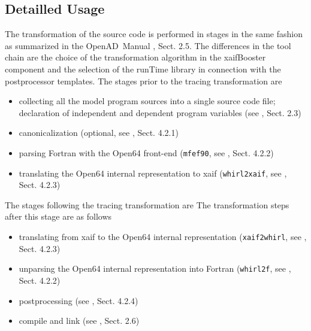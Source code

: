 \documentclass{article}
\newcommand{\openad}{OpenAD}
\begin{document}
\subsection{Detailled Usage}
The transformation of the source code is performed in stages in the same fashion as 
summarized in the \openad\ Manual \cite{userManual}, Sect. 2.5. 
The differences in the tool chain are the choice of the transformation algorithm 
in the xaifBooster component and the selection of the runTime library in connection with 
the postprocessor templates. 
The stages prior to the tracing transformation are 
\begin{itemize}
\item collecting all the model program sources into a  single source code file; declaration of independent and dependent program variables (see \cite{userManual}, Sect. 2.3)
\item canonicalization (optional, see \cite{userManual}, Sect. 4.2.1)
\item parsing Fortran with the Open64 front-end (\lstinline{mfef90}, see \cite{userManual}, Sect. 4.2.2)
\item translating the Open64 internal representation to xaif (\lstinline{whirl2xaif}, see \cite{userManual}, Sect. 4.2.3)
\end{itemize}
The stages following the tracing transformation are 
The transformation steps after this stage are as follows
\begin{itemize}
\item translating from xaif to the Open64 internal representation (\lstinline{xaif2whirl}, see \cite{userManual}, Sect. 4.2.3)
\item unparsing the Open64 internal representation into Fortran (\lstinline{whirl2f}, see \cite{userManual}, Sect. 4.2.2)
\item postprocessing (see \cite{userManual}, Sect. 4.2.4)
\item compile and link (see \cite{userManual}, Sect. 2.6)
\end{itemize}
\end{document}
